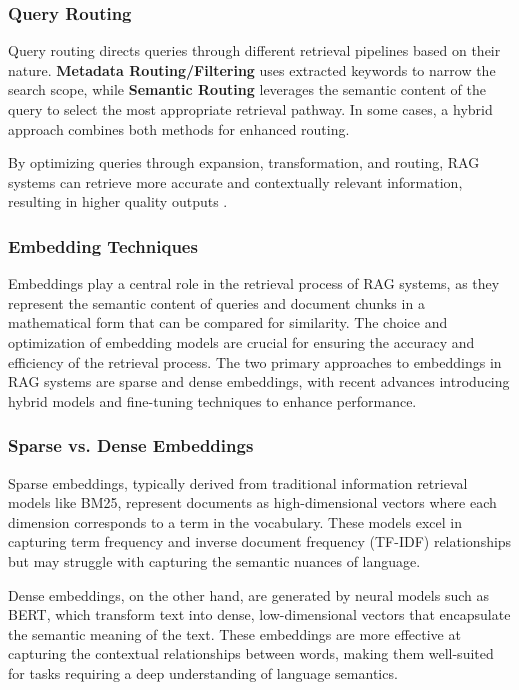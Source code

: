 \subsubsection{Query Routing}

Query routing directs queries through different retrieval pipelines based on their nature. \textbf{Metadata Routing/Filtering} uses extracted keywords to narrow the search scope, while \textbf{Semantic Routing} leverages the semantic content of the query to select the most appropriate retrieval pathway. In some cases, a hybrid approach combines both methods for enhanced routing.

By optimizing queries through expansion, transformation, and routing, RAG systems can retrieve more accurate and contextually relevant information, resulting in higher quality outputs \cite{gao2023retrieval}.

\subsubsection{Embedding Techniques}

Embeddings play a central role in the retrieval process of RAG systems, as they represent the semantic content of queries and document chunks in a mathematical form that can be compared for similarity. The choice and optimization of embedding models are crucial for ensuring the accuracy and efficiency of the retrieval process. The two primary approaches to embeddings in RAG systems are sparse and dense embeddings, with recent advances introducing hybrid models and fine-tuning techniques to enhance performance.

\subsubsection{Sparse vs. Dense Embeddings}

Sparse embeddings, typically derived from traditional information retrieval models like BM25, represent documents as high-dimensional vectors where each dimension corresponds to a term in the vocabulary. These models excel in capturing term frequency and inverse document frequency (TF-IDF) relationships but may struggle with capturing the semantic nuances of language.

Dense embeddings, on the other hand, are generated by neural models such as BERT, which transform text into dense, low-dimensional vectors that encapsulate the semantic meaning of the text. These embeddings are more effective at capturing the contextual relationships between words, making them well-suited for tasks requiring a deep understanding of language semantics.

